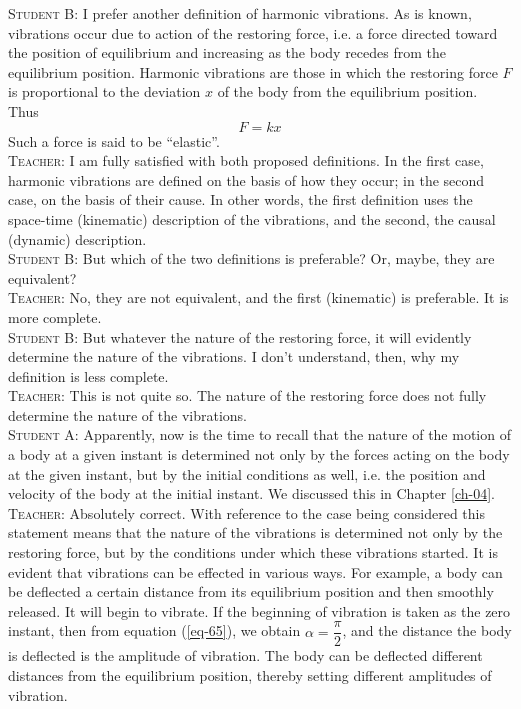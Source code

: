 \documentclass[a4paper,sfsidenotes]{tufte-book}
\begin{document}
\textsc{Student B:} I prefer another definition of harmonic vibrations. As is known, vibrations occur due to action of the restoring force, i.e. a force directed toward the position of equilibrium and increasing as the body recedes from the equilibrium position. Harmonic vibrations are those in which the restoring force $F$ is proportional to the deviation $x$ of the body from the equilibrium position. Thus\\
\begin{equation}
F=kx
\label{eq-66}
\end{equation}
Such a force is said to be ``elastic''.
\\
\textsc{Teacher:} I am fully satisfied with both proposed definitions. In the first case, harmonic vibrations are defined on the basis of how they occur; in the second case, on the basis of their cause. In other words, the first definition uses the space-time (kinematic) description of the vibrations, and the
second, the causal (dynamic) description.
\\
\textsc{Student B:} But which of the two definitions is preferable? Or, maybe, they are equivalent?
\\
\textsc{Teacher:} No, they are not equivalent, and the first (kinematic) is preferable. It is more complete.
\\
\textsc{Student B:} But whatever the nature of the restoring force, it will evidently determine the nature of the vibrations. I don't understand, then, why my definition is less complete.
\\
\textsc{Teacher:} This is not quite so. The nature of the restoring force does not fully determine the nature of the vibrations.
\\
\textsc{Student A:} Apparently, now is the time to recall that the nature of the motion of a body at a given instant is determined not only by the forces acting on the body at the given instant, but by the initial conditions as well, i.e. the position and velocity of the body at the initial instant. We discussed
this in  Chapter \ref{ch-04}.
\\
\textsc{Teacher:} Absolutely correct. With reference to the case being considered this statement means that the nature of the vibrations is determined not only by the restoring force, but by the conditions under which these vibrations started. It is evident that vibrations can be effected in various ways. For
example, a body can be deflected a certain distance from its equilibrium position and then smoothly released. It will begin to vibrate. If the beginning of vibration is taken as the zero instant, then from equation (\ref{eq-65}), we obtain $\alpha=\dfrac{\pi}{2}$, and the distance the body is deflected is the amplitude of vibration. The body can be deflected different distances from the equilibrium position, thereby setting different amplitudes of vibration.
\end{document}
